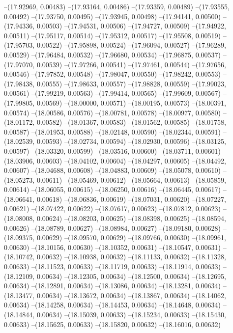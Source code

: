 --(17.92969, 0.00483)
--(17.93164, 0.00486)
--(17.93359, 0.00489)
--(17.93555, 0.00492)
--(17.93750, 0.00495)
--(17.93945, 0.00498)
--(17.94141, 0.00500)
--(17.94336, 0.00503)
--(17.94531, 0.00506)
--(17.94727, 0.00509)
--(17.94922, 0.00511)
--(17.95117, 0.00514)
--(17.95312, 0.00517)
--(17.95508, 0.00519)
--(17.95703, 0.00522)
--(17.95898, 0.00524)
--(17.96094, 0.00527)
--(17.96289, 0.00529)
--(17.96484, 0.00532)
--(17.96680, 0.00534)
--(17.96875, 0.00537)
--(17.97070, 0.00539)
--(17.97266, 0.00541)
--(17.97461, 0.00544)
--(17.97656, 0.00546)
--(17.97852, 0.00548)
--(17.98047, 0.00550)
--(17.98242, 0.00553)
--(17.98438, 0.00555)
--(17.98633, 0.00557)
--(17.98828, 0.00559)
--(17.99023, 0.00561)
--(17.99219, 0.00563)
--(17.99414, 0.00565)
--(17.99609, 0.00567)
--(17.99805, 0.00569)
--(18.00000, 0.00571)
--(18.00195, 0.00573)
--(18.00391, 0.00574)
--(18.00586, 0.00576)
--(18.00781, 0.00578)
--(18.00977, 0.00580)
--(18.01172, 0.00582)
--(18.01367, 0.00583)
--(18.01562, 0.00585)
--(18.01758, 0.00587)
--(18.01953, 0.00588)
--(18.02148, 0.00590)
--(18.02344, 0.00591)
--(18.02539, 0.00593)
--(18.02734, 0.00594)
--(18.02930, 0.00596)
--(18.03125, 0.00597)
--(18.03320, 0.00599)
--(18.03516, 0.00600)
--(18.03711, 0.00601)
--(18.03906, 0.00603)
--(18.04102, 0.00604)
--(18.04297, 0.00605)
--(18.04492, 0.00607)
--(18.04688, 0.00608)
--(18.04883, 0.00609)
--(18.05078, 0.00610)
--(18.05273, 0.00611)
--(18.05469, 0.00612)
--(18.05664, 0.00613)
--(18.05859, 0.00614)
--(18.06055, 0.00615)
--(18.06250, 0.00616)
--(18.06445, 0.00617)
--(18.06641, 0.00618)
--(18.06836, 0.00619)
--(18.07031, 0.00620)
--(18.07227, 0.00621)
--(18.07422, 0.00622)
--(18.07617, 0.00623)
--(18.07812, 0.00623)
--(18.08008, 0.00624)
--(18.08203, 0.00625)
--(18.08398, 0.00625)
--(18.08594, 0.00626)
--(18.08789, 0.00627)
--(18.08984, 0.00627)
--(18.09180, 0.00628)
--(18.09375, 0.00629)
--(18.09570, 0.00629)
--(18.09766, 0.00630)
--(18.09961, 0.00630)
--(18.10156, 0.00630)
--(18.10352, 0.00631)
--(18.10547, 0.00631)
--(18.10742, 0.00632)
--(18.10938, 0.00632)
--(18.11133, 0.00632)
--(18.11328, 0.00633)
--(18.11523, 0.00633)
--(18.11719, 0.00633)
--(18.11914, 0.00633)
--(18.12109, 0.00634)
--(18.12305, 0.00634)
--(18.12500, 0.00634)
--(18.12695, 0.00634)
--(18.12891, 0.00634)
--(18.13086, 0.00634)
--(18.13281, 0.00634)
--(18.13477, 0.00634)
--(18.13672, 0.00634)
--(18.13867, 0.00634)
--(18.14062, 0.00634)
--(18.14258, 0.00634)
--(18.14453, 0.00634)
--(18.14648, 0.00634)
--(18.14844, 0.00634)
--(18.15039, 0.00633)
--(18.15234, 0.00633)
--(18.15430, 0.00633)
--(18.15625, 0.00633)
--(18.15820, 0.00632)
--(18.16016, 0.00632)
